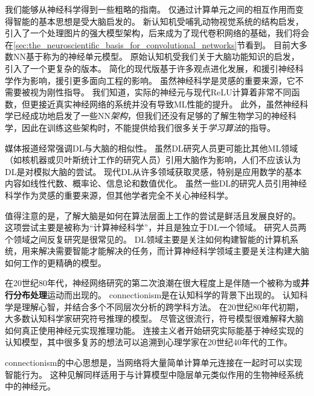 我们能够从神经科学得到一些粗略的指南。
仅通过计算单元之间的相互作用而变得智能的基本思想是受大脑启发的。
新认知机\citep{Fukushima80}受哺乳动物视觉系统的结构启发，引入了一个处理图片的强大模型架构，后来成为了现代卷积网络的基础\citep{LeCun98-small}，我们将会在\ref{sec:the_neuroscientific_basis_for_convolutional_networks}节看到。
目前大多数\gls{NN}基于称为的神经单元模型。
原始认知机\citep{Fukushima75}受我们关于大脑功能知识的启发， 引入了一个更复杂的版本。
简化的现代版基于许多观点进化发展，\citet{Nair-2010}和\citet{Glorot+al-AI-2011-small}援引神经科学作为影响，\citet{Jarrett-ICCV2009}援引更多面向工程的影响。
虽然神经科学是灵感的重要来源，它不需要被视为刚性指导。
我们知道，实际的神经元与现代\gls{ReLU}计算着非常不同函数，但更接近真实神经网络的系统并没有导致\gls{ML}性能的提升。
此外，虽然神经科学已经成功地启发了一些\gls{NN}\emph{架构}，但我们还没有足够的了解生物学习的神经科学，因此在训练这些架构时，不能提供给我们很多关于\emph{学习算法}的指导。

媒体报道经常强调\gls{DL}与大脑的相似性。
虽然\gls{DL}研究人员更可能比其他\gls{ML}领域（如核机器或贝叶斯统计工作的研究人员）引用大脑作为影响，人们不应该认为\gls{DL}是对模拟大脑的尝试。
现代\gls{DL}从许多领域获取灵感，特别是应用数学的基本内容如线性代数、概率论、信息论和数值优化。
虽然一些\gls{DL}的研究人员引用神经科学作为灵感的重要来源，但其他学者完全不关心神经科学。


值得注意的是，了解大脑是如何在算法层面上工作的尝试是鲜活且发展良好的。
这项尝试主要是被称为``计算神经科学''，并且是独立于\gls{DL}一个领域。
研究人员两个领域之间反复研究是很常见的。
\gls{DL}领域主要是关注如何构建智能的计算机系统，用来解决需要智能才能解决的任务，而计算神经科学领域主要是关注构建大脑如何工作的更精确的模型。

在20世纪80年代，神经网络研究的第二次浪潮在很大程度上是伴随一个被称为或\textbf{并行分布处理}运动而出现的\citep{Rumelhart86,mcclelland1995appeal}。
\gls{connectionism}是在认知科学的背景下出现的。
认知科学是理解心智，并结合多个不同层次分析的跨学科方法。
在20世纪80年代初期，大多数认知科学家研究符号推理的模型。
尽管这很流行，符号模型很难解释大脑如何真正使用神经元实现推理功能。 
连接主义者开始研究实际能基于神经实现的认知模型\citep{Touretzky1985}，其中很多复苏的想法可以追溯到心理学家在20世纪40年代的工作\citep{Hebb49}。

\gls{connectionism}的中心思想是，当网络将大量简单计算单元连接在一起时可以实现智能行为。
这种见解同样适用于与计算模型中隐层单元类似作用的生物神经系统中的神经元。  

